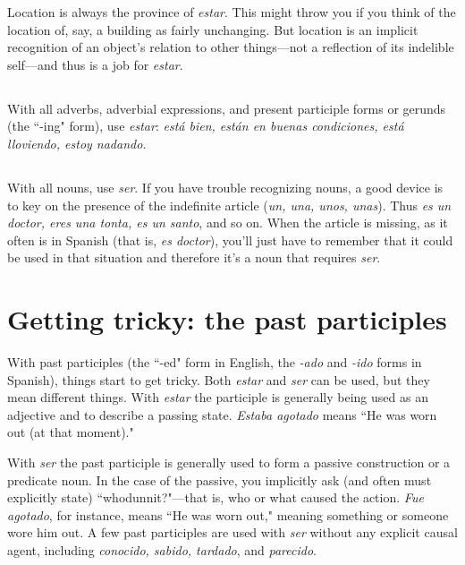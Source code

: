 Location is always the province of \emph{estar}. This might throw
you if you think of the location of, say, a building as fairly unchanging.
But location is an implicit recognition of an object's relation to other
things---not a reflection of its indelible self---and thus is a job for
\emph{estar}.

\subsection{}

With all adverbs, adverbial expressions, and present participle forms or gerunds (the ``-ing" form), use \emph{estar}: \emph{está bien, están en
	buenas condiciones, está lloviendo, estoy nadando.}

\subsection{}

With all nouns, use \emph{ser}. If you have trouble recognizing
nouns, a good device is to key on the presence of the indefinite article
(\emph{un, una, unos, unas}). Thus \emph{es un doctor, eres una tonta, es un santo},
and so on. When the article is missing, as it often is in Spanish (that is,
\emph{es doctor}), you'll just have to remember that it could be used in that
situation and therefore it's a noun that requires \emph{ser}.

\section{Getting tricky: the past participles}

With past participles (the ``-ed" form in English, the \emph{-ado} and
\emph{-ido} forms in Spanish), things start to get tricky. Both \emph{estar} and \emph{ser}
can be used, but they mean different things. With \emph{estar} the participle
is generally being used as an adjective and to describe a passing state.
\emph{Estaba agotado} means ``He was worn out (at that moment)."

With \emph{ser} the past participle is generally used to form a passive
construction or a predicate noun. In the case of the passive, you implicitly ask (and often must explicitly state) ``whodunnit?"---that is,
who or what caused the action. \emph{Fue agotado}, for instance, means ``He
was worn out," meaning something or someone wore him out. A few
past participles are used with \emph{ser} without any explicit causal agent, including \emph{conocido, sabido, tardado}, and \emph{parecido}.

